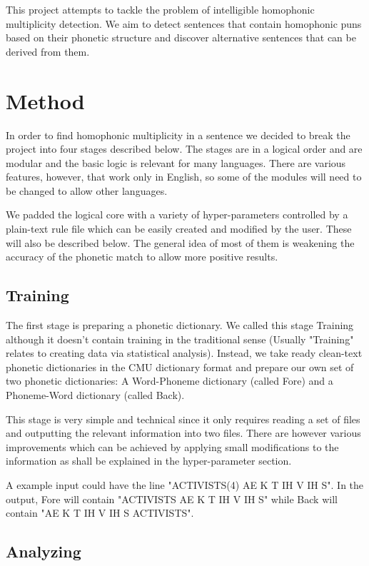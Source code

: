 \documentclass[11pt,a4paper]{article}
\begin{document}
This project attempts to tackle the problem of intelligible homophonic multiplicity detection. We aim to detect sentences that contain homophonic puns based on their phonetic structure and discover alternative sentences that can be derived from them.

\section{Method}

In order to find homophonic multiplicity in a sentence we decided to break the project into four stages described below. The stages are in a logical order and are modular and the basic logic is relevant for many languages. There are various features, however, that work only in English, so some of the modules will need to be changed to allow other languages.

We padded the logical core with a variety of hyper-parameters controlled by a plain-text rule file which can be easily created and modified by the user. These will also be described below. The general idea of most of them is weakening the accuracy of the phonetic match to allow more positive results.

\subsection{Training}

The first stage is preparing a phonetic dictionary. We called this stage Training although it doesn't contain training in the traditional sense (Usually "Training" relates to creating data via statistical analysis). Instead, we take ready clean-text phonetic dictionaries in the CMU dictionary format and prepare our own set of two phonetic dictionaries: A Word-Phoneme dictionary (called Fore) and a Phoneme-Word dictionary (called Back).

This stage is very simple and technical since it only requires reading a set of files and outputting the relevant information into two files. There are however various improvements which can be achieved by applying small modifications to the information as shall be explained in the hyper-parameter section.

A example input could have the line "ACTIVISTS(4)	AE K T IH V IH S". In the output, Fore will contain "ACTIVISTS	AE K T IH V IH S" while Back will contain "AE K T IH V IH S ACTIVISTS".

\subsection{Analyzing}
\end{document}
